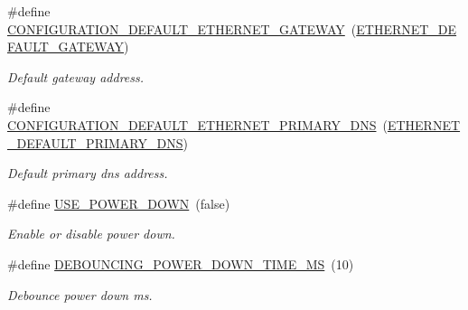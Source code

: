 \begin{DoxyCompactItemize}
\mbox{\label{rmap-config_8h_adb31ecf5d2e45dab1b0508a21313267b}} 
\#define \hyperlink{rmap-config_8h_adb31ecf5d2e45dab1b0508a21313267b}{C\+O\+N\+F\+I\+G\+U\+R\+A\+T\+I\+O\+N\+\_\+\+D\+E\+F\+A\+U\+L\+T\+\_\+\+E\+T\+H\+E\+R\+N\+E\+T\+\_\+\+G\+A\+T\+E\+W\+AY}~(\hyperlink{ethernet__config_8h_a47956941b8ebab9ce04debc51848bfbd}{E\+T\+H\+E\+R\+N\+E\+T\+\_\+\+D\+E\+F\+A\+U\+L\+T\+\_\+\+G\+A\+T\+E\+W\+AY})
\begin{DoxyCompactList}\small\item\em Default gateway address. \end{DoxyCompactList}\item 
\mbox{\label{rmap-config_8h_a7e0faf050a00ee299bd47f28d9b38c63}} 
\#define \hyperlink{rmap-config_8h_a7e0faf050a00ee299bd47f28d9b38c63}{C\+O\+N\+F\+I\+G\+U\+R\+A\+T\+I\+O\+N\+\_\+\+D\+E\+F\+A\+U\+L\+T\+\_\+\+E\+T\+H\+E\+R\+N\+E\+T\+\_\+\+P\+R\+I\+M\+A\+R\+Y\+\_\+\+D\+NS}~(\hyperlink{ethernet__config_8h_ae21c97b50820450862c66c8d1d7f07e8}{E\+T\+H\+E\+R\+N\+E\+T\+\_\+\+D\+E\+F\+A\+U\+L\+T\+\_\+\+P\+R\+I\+M\+A\+R\+Y\+\_\+\+D\+NS})
\begin{DoxyCompactList}\small\item\em Default primary dns address. \end{DoxyCompactList}\item 
\mbox{\label{rmap-config_8h_a9ace81994cbeb6153f9dd5adf0e6dbee}} 
\#define \hyperlink{rmap-config_8h_a9ace81994cbeb6153f9dd5adf0e6dbee}{U\+S\+E\+\_\+\+P\+O\+W\+E\+R\+\_\+\+D\+O\+WN}~(false)
\begin{DoxyCompactList}\small\item\em Enable or disable power down. \end{DoxyCompactList}\item 
\mbox{\label{rmap-config_8h_a7b9497e328b8f872cd7677cfd02bbf65}} 
\#define \hyperlink{rmap-config_8h_a7b9497e328b8f872cd7677cfd02bbf65}{D\+E\+B\+O\+U\+N\+C\+I\+N\+G\+\_\+\+P\+O\+W\+E\+R\+\_\+\+D\+O\+W\+N\+\_\+\+T\+I\+M\+E\+\_\+\+MS}~(10)
\begin{DoxyCompactList}\small\item\em Debounce power down ms. \end{DoxyCompactList}\item 
\mbox{\label{rmap-config_8h_a8051c2a569a9f9c488af89bce47ec306}} 

\end{DoxyCompactItemize}
